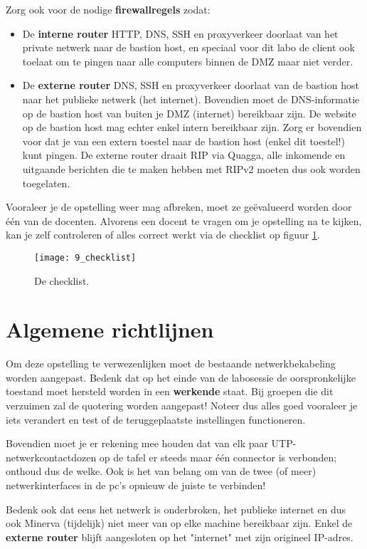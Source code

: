 \documentclass{report}
\begin{document}
Zorg ook voor de nodige \textbf{firewallregels} zodat:
\begin{itemize}
    \item De \textbf{interne router} HTTP, DNS, SSH en proxyverkeer doorlaat van het private netwerk naar de bastion host, en speciaal voor dit labo de client ook toelaat om te pingen naar alle computers binnen de DMZ maar niet verder.
    \item  De \textbf{externe router} DNS, SSH en proxyverkeer doorlaat van de bastion host naar het publieke netwerk (het internet).
    Bovendien moet de DNS-informatie op de bastion host van buiten je DMZ (internet) bereikbaar zijn.
    De website op de bastion host mag echter enkel intern bereikbaar zijn.
    Zorg er bovendien voor dat je van een extern toestel naar de bastion host (enkel dit toestel!) kunt pingen.
    De externe router draait RIP via Quagga, alle inkomende en uitgaande berichten die te maken hebben met RIPv2 moeten dus ook worden toegelaten.
\end{itemize}


Vooraleer je de opstelling weer mag afbreken, moet ze geëvalueerd worden door één van de docenten.
Alvorens een docent te vragen om je opstelling na te kijken, kan je zelf controleren of alles correct werkt via de checklist op figuur \ref{fig:checklist}.
\begin{figure}[ht]
	\centering
	\texttt{[image: 9\_checklist]}
	\caption{De checklist.}
	\label{fig:checklist}
\end{figure}

\section{Algemene richtlijnen}


Om deze opstelling te verwezenlijken moet de bestaande netwerkbekabeling worden aangepast.
Bedenk dat op het einde van de labosessie de oorspronkelijke toestand moet hersteld worden in een \textbf{werkende} staat.
Bij groepen die dit verzuimen zal de quotering worden aangepast!
Noteer dus alles goed vooraleer je iets verandert en test of de teruggeplaatste instellingen functioneren.

Bovendien moet je er rekening mee houden dat van elk paar UTP-netwerkcontactdozen op de tafel er steeds maar één connector is verbonden; onthoud dus de welke.
Ook is het van belang om van de twee (of meer) netwerkinterfaces in de pc's opnieuw de juiste te verbinden!

Bedenk ook dat eens het netwerk is onderbroken, het publieke internet en dus ook Minerva (tijdelijk) niet meer van op elke machine bereikbaar zijn.
Enkel de \textbf{externe router} blijft aangesloten op het "internet" met zijn origineel IP-adres. 
\end{document}
